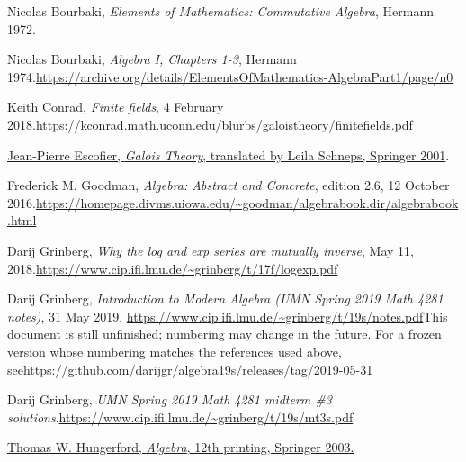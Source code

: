 \documentclass[numbers=enddot,12pt,final,onecolumn,notitlepage]{scrartcl}%
\theoremstyle{definition}
\begin{document}
\begin{thebibliography}{999999999}                                                                                        %


Nicolas Bourbaki, \textit{Elements of Mathematics:
Commutative Algebra}, Hermann 1972.

Nicolas Bourbaki, \textit{Algebra I, Chapters
1-3}, Hermann 1974.\newline\url{https://archive.org/details/ElementsOfMathematics-AlgebraPart1/page/n0}

Keith Conrad, \textit{Finite fields}, 4 February
2018.\newline\url{https://kconrad.math.uconn.edu/blurbs/galoistheory/finitefields.pdf}

%
\href{https://dx.doi.org/10.1007/978-1-4613-0191-2}{Jean-Pierre Escofier,
\textit{Galois Theory}, translated by Leila Schneps, Springer 2001}.

Frederick M. Goodman, \textit{Algebra: Abstract and
Concrete}, edition 2.6, 12 October 2016.\newline\url{https://homepage.divms.uiowa.edu/~goodman/algebrabook.dir/algebrabook.html}

Darij Grinberg, \textit{Why the log and exp series
are mutually inverse}, May 11, 2018.\newline\url{https://www.cip.ifi.lmu.de/~grinberg/t/17f/logexp.pdf}

Darij Grinberg, \textit{Introduction to Modern Algebra
(UMN Spring 2019 Math 4281 notes)}, 31 May 2019.\newline%
\url{https://www.cip.ifi.lmu.de/~grinberg/t/19s/notes.pdf}\newline This
document is still unfinished; numbering may change in the future. For a frozen
version whose numbering matches the references used above, see\newline\url{https://github.com/darijgr/algebra19s/releases/tag/2019-05-31}

Darij Grinberg, \textit{UMN Spring 2019 Math 4281
midterm \#3 solutions}.\newline\url{https://www.cip.ifi.lmu.de/~grinberg/t/19s/mt3s.pdf}

%
\href{http://link.springer.com/book/10.1007/978-1-4612-6101-8}{Thomas W.
Hungerford, \textit{Algebra}, 12th printing, Springer 2003.}


\end{thebibliography}
\end{document}
